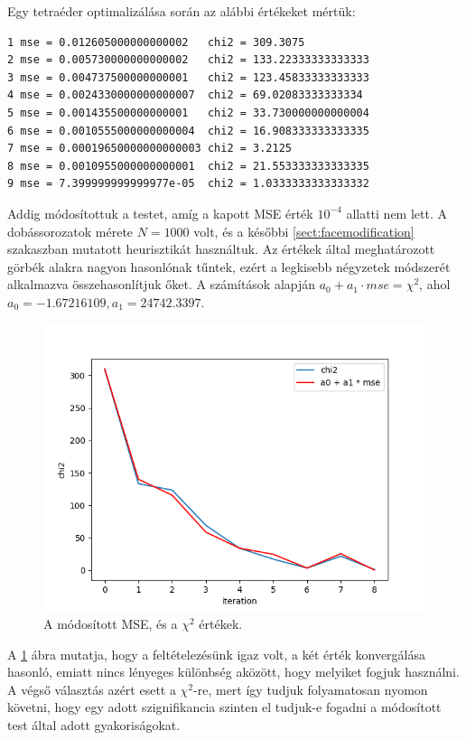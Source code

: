 Egy tetraéder optimalizálása során az alábbi értékeket mértük:
\begin{verbatim}
1 mse = 0.012605000000000002   chi2 = 309.3075
2 mse = 0.005730000000000002   chi2 = 133.22333333333333
3 mse = 0.004737500000000001   chi2 = 123.45833333333333
4 mse = 0.0024330000000000007  chi2 = 69.02083333333334
5 mse = 0.001435500000000001   chi2 = 33.730000000000004
6 mse = 0.0010555000000000004  chi2 = 16.908333333333335
7 mse = 0.00019650000000000003 chi2 = 3.2125
8 mse = 0.0010955000000000001  chi2 = 21.553333333333335
9 mse = 7.399999999999977e-05  chi2 = 1.0333333333333332
\end{verbatim}
Addig módosítottuk a testet, amíg a kapott MSE érték $10^{-4}$ allatti nem lett. A dobássorozatok mérete $N=1000$ volt, és a későbbi \ref{sect:facemodification} szakaszban mutatott heurisztikát használtuk.
Az értékek által meghatározott görbék alakra nagyon hasonlónak tűntek, ezért a legkisebb négyzetek módszerét alkalmazva összehasonlítjuk őket.
A számítások alapján $a_0 + a_1\cdot mse = \chi^2$, ahol $a_0 = -1.67216109, a_1 = 24742.3397$.
\begin{figure}[h!]
	\centering
	\includegraphics[scale=0.7]{images/mse_vs_chi2.png}
	\caption{A módosított MSE, és a $\chi^2$ értékek.}
	\label{fig:mse_vs_chi2}
\end{figure}
A \ref{fig:mse_vs_chi2} ábra mutatja, hogy a feltételezésünk igaz volt, a két érték konvergálása hasonló, emiatt nincs lényeges különbség aközött, hogy melyiket fogjuk használni.
A végső választás azért esett a $\chi^2$-re, mert így tudjuk folyamatosan nyomon követni, hogy egy adott szignifikancia szinten el tudjuk-e fogadni a módosított test által adott gyakoriságokat.

